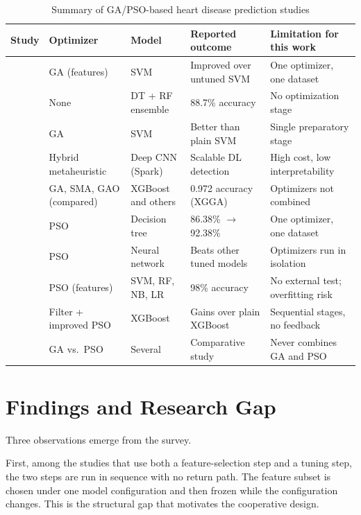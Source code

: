 \documentclass[MTech]{ugthesis}
\begin{document}
\begin{table}[htpb]
\small
\renewcommand{\arraystretch}{1.3}
\caption{Summary of GA/PSO-based heart disease prediction studies}
\label{tab:lit}
\begin{tabular}{|p{2.6cm}|p{2.4cm}|p{2.2cm}|p{3.2cm}|p{3.4cm}|}
\hline
\textbf{Study} & \textbf{Optimizer} & \textbf{Model} & \textbf{Reported outcome} & \textbf{Limitation for this work} \\ \hline
\citet{warsi2024gasvm} & GA (features) & SVM & Improved over untuned SVM & One optimizer, one dataset \\ \hline
\citet{kavitha2021hybrid} & None & DT + RF ensemble & 88.7\% accuracy & No optimization stage \\ \hline
\citet{effective2021gasvm} & GA & SVM & Better than plain SVM & Single preparatory stage \\ \hline
\citet{kanchanamala2023spark} & Hybrid metaheuristic & Deep CNN (Spark) & Scalable DL detection & High cost, low interpretability \\ \hline
\citet{zhang2024xgga} & GA, SMA, GAO (compared) & XGBoost and others & 0.972 accuracy (XGGA) & Optimizers not combined \\ \hline
\citet{majumder2025psodt} & PSO & Decision tree & 86.38\% $\rightarrow$ 92.38\% & One optimizer, one dataset \\ \hline
\citet{reddy2025psonn} & PSO & Neural network & Beats other tuned models & Optimizers run in isolation \\ \hline
\citet{nagavelli2024pso} & PSO (features) & SVM, RF, NB, LR & 98\% accuracy & No external test; overfitting risk \\ \hline
\citet{cao2025dlpso} & Filter + improved PSO & XGBoost & Gains over plain XGBoost & Sequential stages, no feedback \\ \hline
\citet{wadhawan2026gavspso} & GA vs.\ PSO & Several & Comparative study & Never combines GA and PSO \\ \hline
\end{tabular}
\end{table}

\section{Findings and Research Gap}
\label{sec:gap}
Three observations emerge from the survey.

First, among the studies that use both a feature-selection step and a tuning step, the two steps are run in sequence with no return path. The feature subset is chosen under one model configuration and then frozen while the configuration changes. This is the structural gap that motivates the cooperative design.
\end{document}
